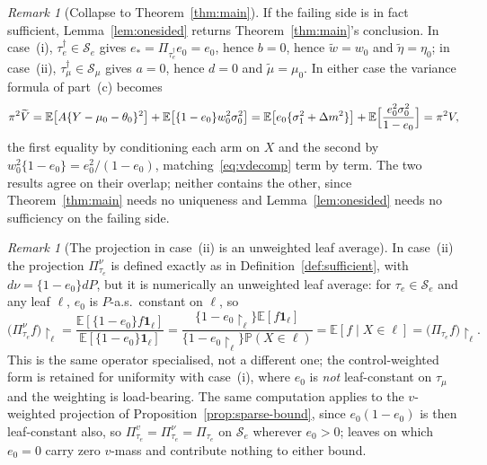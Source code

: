 \documentclass[11pt]{article}
\theoremstyle{plain}
\theoremstyle{definition}
\theoremstyle{remark}
\newtheorem{remark}[theorem]{Remark}
\newcommand{\E}{\mathbb{E}}
\newcommand{\PP}{\mathbb{P}}
\newcommand{\cS}{\mathcal{S}}
\newcommand{\ez}{e_0}
\newcommand{\mz}{\mu_0}
\newcommand{\wz}{w_0}
\newcommand{\etatil}{\widetilde{\eta}}
\newcommand{\wtil}{\widetilde{w}}
\newcommand{\mtil}{\widetilde{\mu}}
\newcommand{\Vtil}{\widetilde{V}}
\begin{document}
\begin{remark}[Collapse to Theorem~\ref{thm:main}]\label{rem:onesided-collapse}
If the failing side is in fact sufficient, Lemma~\ref{lem:onesided} returns
Theorem~\ref{thm:main}'s conclusion. In case~(i), $\tau^\dagger_e\in\cS_e$ gives
$e_*=\Pi_{\tau^\dagger_e}\ez=\ez$, hence $b=0$, hence $\wtil=\wz$ and
$\etatil=\eta_0$; in case~(ii), $\tau^\dagger_\mu\in\cS_\mu$ gives $a=0$, hence
$d=0$ and $\mtil=\mz$. In either case the variance formula of part~(c) becomes
\[
  \pi^2\Vtil=\E\bigl[A\{Y-\mz-\theta_0\}^2\bigr]
   +\E\bigl[\{1-\ez\}\wz^2\sigma_0^2\bigr]
  =\E\bigl[\ez\{\sigma_1^2+\Delta m^2\}\bigr]
   +\E\Bigl[\frac{\ez^2\sigma_0^2}{1-\ez}\Bigr]
  =\pi^2V,
\]
the first equality by conditioning each arm on $X$ and the second by
$\wz^2\{1-\ez\}=\ez^2/(1-\ez)$, matching~\eqref{eq:vdecomp} term by term. The
two results agree on their overlap; neither contains the other, since
Theorem~\ref{thm:main} needs no uniqueness and Lemma~\ref{lem:onesided} needs no
sufficiency on the failing side.
\end{remark}

\begin{remark}[The projection in case~(ii) is an unweighted leaf average]
\label{rem:onesided-unweighted}
In case~(ii) the projection $\Pi^\nu_{\tau_e}$ is defined exactly as in
Definition~\ref{def:sufficient}, with $d\nu=\{1-\ez\}dP$, but it is numerically
an unweighted leaf average: for $\tau_e\in\cS_e$ and any leaf $\ell$, $\ez$ is
$P$-a.s.\ constant on $\ell$, so
\[
  \bigl(\Pi^\nu_{\tau_e}f\bigr)\restriction_\ell
  =\frac{\E[\{1-\ez\}f\mathbf1_\ell]}{\E[\{1-\ez\}\mathbf1_\ell]}
  =\frac{\{1-\ez\restriction_\ell\}\E[f\mathbf1_\ell]}
        {\{1-\ez\restriction_\ell\}\PP(X\in\ell)}
  =\E[f\mid X\in\ell]
  =\bigl(\Pi_{\tau_e}f\bigr)\restriction_\ell .
\]
This is the same operator specialised, not a different one; the control-weighted
form is retained for uniformity with case~(i), where $\ez$ is \emph{not}
leaf-constant on $\tau_\mu$ and the weighting is load-bearing. The same
computation applies to the $v$-weighted projection of
Proposition~\ref{prop:sparse-bound}, since $\ez(1-\ez)$ is then leaf-constant
also, so $\Pi^v_{\tau_e}=\Pi^\nu_{\tau_e}=\Pi_{\tau_e}$ on $\cS_e$ wherever
$\ez>0$; leaves on which $\ez=0$ carry zero $v$-mass and contribute nothing to
either bound.
\end{remark}
\end{document}

